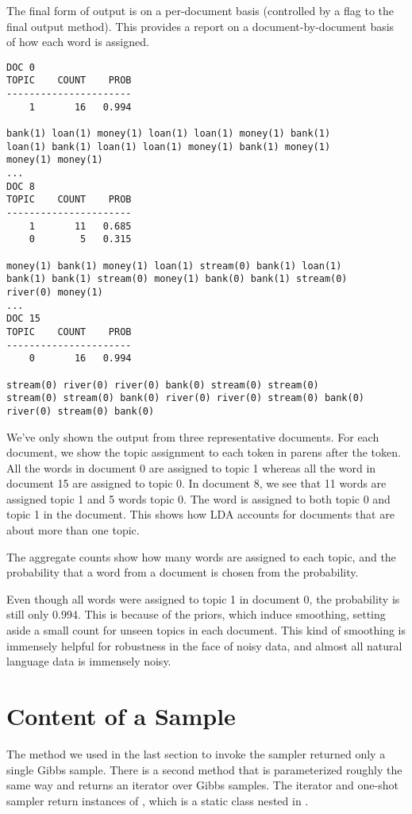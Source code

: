 The final form of output is on a per-document basis (controlled
by a flag to the final output method).  This provides a report
on a document-by-document basis of how each word is assigned.
%
\begin{verbatim}
DOC 0
TOPIC    COUNT    PROB
----------------------
    1       16   0.994

bank(1) loan(1) money(1) loan(1) loan(1) money(1) bank(1) 
loan(1) bank(1) loan(1) loan(1) money(1) bank(1) money(1) 
money(1) money(1)
...
DOC 8
TOPIC    COUNT    PROB
----------------------
    1       11   0.685
    0        5   0.315

money(1) bank(1) money(1) loan(1) stream(0) bank(1) loan(1) 
bank(1) bank(1) stream(0) money(1) bank(0) bank(1) stream(0) 
river(0) money(1)
...
DOC 15
TOPIC    COUNT    PROB
----------------------
    0       16   0.994

stream(0) river(0) river(0) bank(0) stream(0) stream(0) 
stream(0) stream(0) bank(0) river(0) river(0) stream(0) bank(0) 
river(0) stream(0) bank(0)
\end{verbatim}
%
We've only shown the output from three representative documents.  For
each document, we show the topic assignment to each token in parens
after the token.  All the words in document 0 are assigned to topic 1
whereas all the word in document 15 are assigned to topic 0.  In
document 8, we see that 11 words are assigned topic 1 and 5 words
topic 0.  The word  is assigned to both topic 0
and topic 1 in the document.  This shows how LDA accounts for
documents that are about more than one topic.

The aggregate counts show how many words are assigned to each topic,
and the probability that a word from a document is chosen from the
probability.  

Even though all words were assigned to topic 1 in document 0, the
probability is still only 0.994.  This is because of the priors, which
induce smoothing, setting aside a small count for unseen topics in
each document.  This kind of smoothing is immensely helpful for
robustness in the face of noisy data, and almost all natural language
data is immensely noisy.


\section{Content of a Sample}

The method we used in the last section to invoke the sampler returned
only a single Gibbs sample.  There is a second method that is
parameterized roughly the same way and returns an iterator over Gibbs
samples.  The iterator and one-shot sampler return instances of
, which is a static class nested in
.

